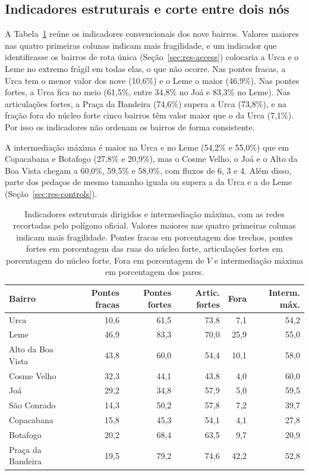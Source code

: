\subsection{Indicadores estruturais e corte entre dois nós}
\label{sec:res-struct}

A Tabela~\ref{tab:estrutural} reúne os indicadores convencionais dos nove
bairros. Valores maiores nas quatro primeiras colunas indicam mais
fragilidade, e um indicador que identificasse os bairros de rota única
(Seção~\ref{sec:res-access}) colocaria a Urca e o Leme no extremo frágil em todas
elas, o que não ocorre.
Nas pontes fracas, a Urca tem o menor valor dos nove (10,6\%) e o Leme o maior
(46,9\%). Nas pontes fortes, a Urca fica no meio (61,5\%, entre 34,8\% no Joá e
83,3\% no Leme). Nas articulações fortes, a Praça da Bandeira (74,6\%) supera a
Urca (73,8\%), e na fração fora do núcleo forte cinco bairros têm valor maior
que o da Urca (7,1\%). Por isso os indicadores não ordenam os bairros de forma
consistente.

A intermediação máxima é maior na Urca e no Leme (54,2\% e 55,0\%) que em
Copacabana e Botafogo (27,8\% e 20,9\%), mas o Cosme Velho, o Joá e o Alto da
Boa Vista chegam a 60,0\%, 59,5\% e 58,0\%, com fluxos de 6, 3 e 4. Além disso,
parte dos pedaços de mesmo tamanho iguala ou supera a da Urca e a do Leme
(Seção~\ref{sec:res-controls}).

\begin{table}[tbp]
\centering
\caption{Indicadores estruturais dirigidos e intermediação máxima, com as
redes recortadas pelo polígono oficial. Valores maiores nas quatro primeiras
colunas indicam mais fragilidade. Pontes fracas em porcentagem dos trechos,
pontes fortes em porcentagem das ruas do núcleo forte, articulações fortes em
porcentagem do núcleo forte, Fora em porcentagem de $V$ e intermediação máxima
em porcentagem dos pares.}
\label{tab:estrutural}
\small
\setlength{\tabcolsep}{4pt}
\begin{tabular}{lrrrrr}
\toprule
Bairro & Pontes fracas & Pontes fortes & Artic. fortes & Fora & Interm. máx. \\
\midrule
Urca              & 10,6 & 61,5 & 73,8 &  7,1 & 54,2 \\
Leme              & 46,9 & 83,3 & 70,0 & 25,9 & 55,0 \\
Alto da Boa Vista & 43,8 & 60,0 & 54,4 & 10,1 & 58,0 \\
Cosme Velho       & 32,3 & 44,1 & 43,8 &  4,0 & 60,0 \\
Joá               & 29,2 & 34,8 & 57,9 &  5,0 & 59,5 \\
São Conrado       & 14,3 & 50,2 & 57,8 &  7,2 & 39,7 \\
Copacabana        & 15,8 & 45,3 & 54,1 &  4,1 & 27,8 \\
Botafogo          & 20,2 & 68,4 & 63,5 &  9,7 & 20,9 \\
Praça da Bandeira & 19,5 & 79,2 & 74,6 & 42,2 & 52,8 \\
\bottomrule
\end{tabular}
\end{table}

